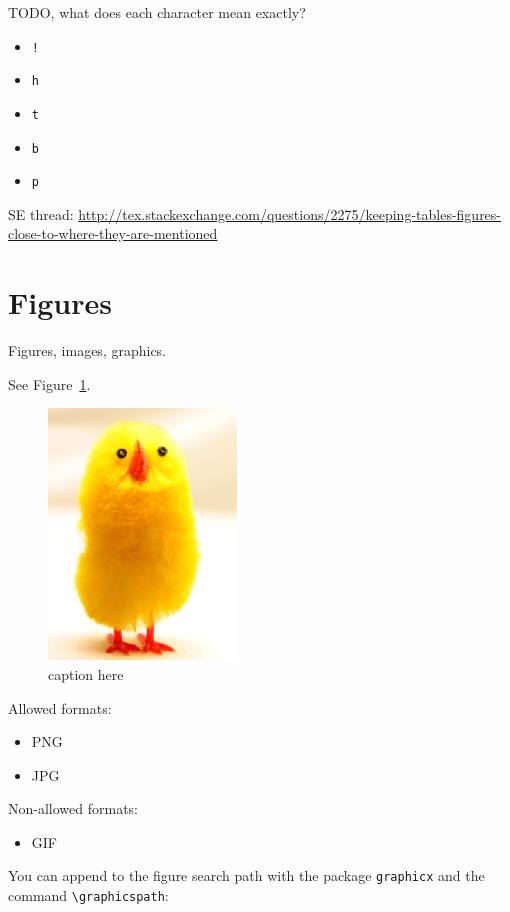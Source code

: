 \documentclass[12pt]{article}
\begin{document}
  TODO, what does each character mean exactly?

  \begin{itemize}
    \item \lstinline|!|
    \item \lstinline|h|
    \item \lstinline|t|
    \item \lstinline|b|
    \item \lstinline|p|
  \end{itemize}

  SE thread: \url{http://tex.stackexchange.com/questions/2275/keeping-tables-figures-close-to-where-they-are-mentioned}

\section{Figures}\label{figures}

  Figures, images, graphics.

  See Figure~\ref{fig-label}.

  \begin{figure}[htb]
    \includegraphics[width=5cm]{image.png}
    \caption{caption here}
    \label{fig-label}
  \end{figure}

  Allowed formats:

  \begin{itemize}
    \item PNG
    \item JPG
  \end{itemize}

  Non-allowed formats:

  \begin{itemize}
    \item GIF
  \end{itemize}

  You can append to the figure search path with the package \lstinline|graphicx| and the command \lstinline|\graphicspath|:
\end{document}
